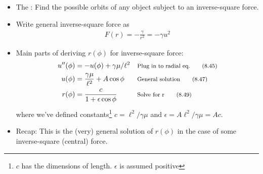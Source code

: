 \documentclass[10pt, twocolumn]{article}
\newcommand\tlab[1]{\tag{#1}\label{#1}}
\begin{document}
\subsection{}
\begin{itemize}
	\item The : Find the possible orbits of any object subject to an inverse-square force. 
	\item Write general inverse-square force as
	\begin{align}
		F(r) = -\frac{\gamma}{r^2} = -\gamma u^2 \tlab{8.44} 
	\end{align}
	\item Main parts of deriving $r(\phi)$ for inverse-square force:
	\begin{align}
	u''(\phi) &= -u(\phi) + \gamma\mu/\ell^2 &&  \footnotesize{\text{Plug in to radial eq.}} \tlab{8.45} \\
	u(\phi) &= \frac{\gamma\mu}{\ell^2} + A\cos\phi &&  \footnotesize{\text{General solution}} \tlab{8.47} \\
	r(\phi) &= \dfrac{c}{1 + \epsilon\cos\phi} &&  \footnotesize{\text{Solve for r}} \tlab{8.49} \\
	\end{align}
	where we've defined constants\footnote{$c$ has the dimensions of length. $\epsilon$ is assumed positive} $c = \ell^2/\gamma\mu$ and $\epsilon = A\ell^2/\gamma\mu = Ac$. 
	\item Recap: This is the (very) general solution of $r(\phi)$ in the case of some inverse-square (central) force. 
\end{itemize}
\end{document}
